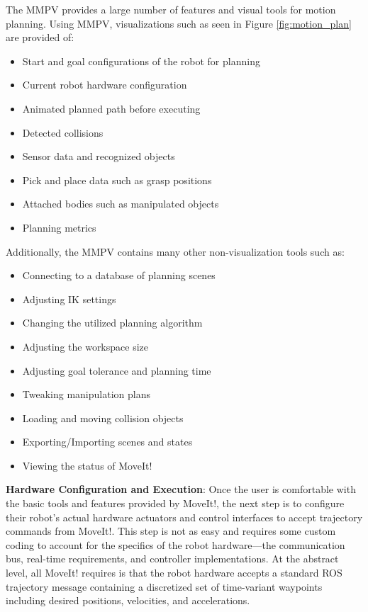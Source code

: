 \documentclass[10pt,journal,compsoc]{joser1}
\begin{document}
{The MMPV provides a large number of features and visual tools for motion planning. Using MMPV, visualizations such as seen in Figure \ref{fig:motion_plan} are provided of:

\begin{itemize}
    \item Start and goal configurations of the robot for planning
    \item Current robot hardware configuration
    \item Animated planned path before executing
    \item Detected collisions
    \item Sensor data and recognized objects
    \item Pick and place data such as grasp positions
    \item Attached bodies such as manipulated objects
    \item Planning metrics
\end{itemize}

Additionally, the MMPV contains many other non-visualization tools such as:
\begin{itemize}
    \item Connecting to a database of planning scenes
    \item Adjusting IK settings
    \item Changing the utilized planning algorithm
    \item Adjusting the workspace size
    \item Adjusting goal tolerance and planning time
    \item Tweaking manipulation plans
    \item Loading and moving collision objects
    \item Exporting/Importing scenes and states
    \item Viewing the status of MoveIt!
\end{itemize}

{\bf Hardware Configuration and Execution}: Once the user is comfortable with the basic tools and features provided by MoveIt!, the next step is to configure their robot's actual hardware actuators and control interfaces to accept trajectory commands from MoveIt!. This step is not as easy and requires some custom coding to account for the specifics of the robot hardware---the communication bus, real-time requirements, and controller implementations. At the abstract level, all MoveIt! requires is that the robot hardware accepts a standard ROS trajectory message containing a discretized set of time-variant waypoints including desired positions, velocities, and accelerations.  

}
\end{document}
